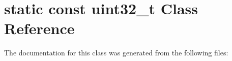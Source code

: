 \hypertarget{classstatic_01const_01uint32__t}{}\section{static const uint32\+\_\+t Class Reference}
\label{classstatic_01const_01uint32__t}


The documentation for this class was generated from the following files\+: